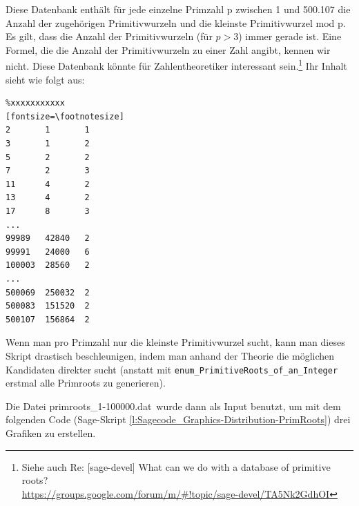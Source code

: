 \begin{refsegment}
Diese Datenbank enthält für jede einzelne Primzahl p zwischen 1 und 500.107
die Anzahl der zugehörigen Primitivwurzeln und die kleinste Primitivwurzel mod p.
Es gilt, dass die Anzahl der Primitivwurzeln (für $p>3$) immer gerade ist.
Eine Formel, die die Anzahl der Primitivwurzeln zu einer Zahl angibt, kennen wir nicht.
Diese Datenbank könnte für Zahlentheoretiker interessant sein.\footnote{%
  Siehe auch Re: [sage-devel] What can we do with a database of primitive roots?\\
  \url{https://groups.google.com/forum/m/#!topic/sage-devel/TA5Nk2GdhOI}
}
%
%
Ihr Inhalt sieht wie folgt aus:
\begin{Verbatim}%xxxxxxxxxxx
[fontsize=\footnotesize]
2       1       1
3       1       2
5       2       2
7       2       3
11      4       2
13      4       2
17      8       3
...
99989   42840   2
99991   24000   6
100003  28560   2
...
500069  250032  2
500083  151520  2
500107  156864  2
\end{Verbatim}


Wenn man pro Primzahl nur die kleinste Primitivwurzel sucht, kann man dieses Skript
drastisch beschleunigen, indem man anhand der Theorie die möglichen Kandidaten direkter
sucht (anstatt mit \verb!enum_PrimitiveRoots_of_an_Integer! erstmal alle Primroots zu
generieren).






 Die Datei \glqq primroots\_1-100000.dat\grqq~wurde dann als Input benutzt,
um mit dem folgenden Code (Sage-Skript \ref{l:Sagecode_Graphics-Distribution-PrimRoots})
drei Grafiken zu erstellen.


\end{refsegment}
